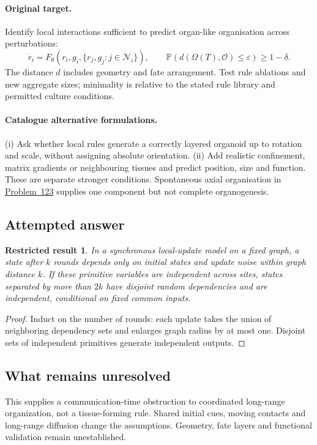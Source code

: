 \documentclass[11pt]{article}
\newcommand{\Prob}{\mathbb P}
\providecommand{\Prob}{\mathbb P}
\newtheorem{attemptresult}{Restricted result}[section]
\begin{document}
\paragraph{Original target.}
Identify local interactions sufficient to predict organ-like organisation across perturbations:
\[
\dot r_i=F_\theta(r_i,g_i,\{r_j,g_j:j\in\mathcal N_i\}),
\qquad
\Prob(d(\Omega(T),\mathcal O)\leq\varepsilon)\geq1-\delta.
\]
The distance $d$ includes geometry and fate arrangement. Test rule ablations and new aggregate sizes; minimality is relative to the stated rule library and permitted culture conditions.
\paragraph{Catalogue alternative formulations.}
(i) Ask whether local rules generate a correctly layered organoid up to rotation and scale, without assigning absolute orientation. (ii) Add realistic confinement, matrix gradients or neighbouring tissues and predict position, size and function. These are separate stronger conditions. Spontaneous axial organisation in \href{https://we-solve.github.io/problems/developmental-symmetry-breaking-52f5cb4e/}{Problem~123} supplies one component but not complete organogenesis.
\subsection{Attempted answer}
\begin{attemptresult}
In a synchronous local-update model on a fixed graph, a state after $k$ rounds depends only on initial states and update noise within graph distance $k$. If these primitive variables are independent across sites, states separated by more than $2k$ have disjoint random dependencies and are independent, conditional on fixed common inputs.
\end{attemptresult}
\begin{proof}
Induct on the number of rounds: each update takes the union of neighboring dependency sets and enlarges graph radius by at most one. Disjoint sets of independent primitives generate independent outputs.
\end{proof}
\subsection{What remains unresolved}
This supplies a communication-time obstruction to coordinated long-range organization, not a tissue-forming rule. Shared initial cues, moving contacts and long-range diffusion change the assumptions. Geometry, fate layers and functional validation remain unestablished.
\end{document}
